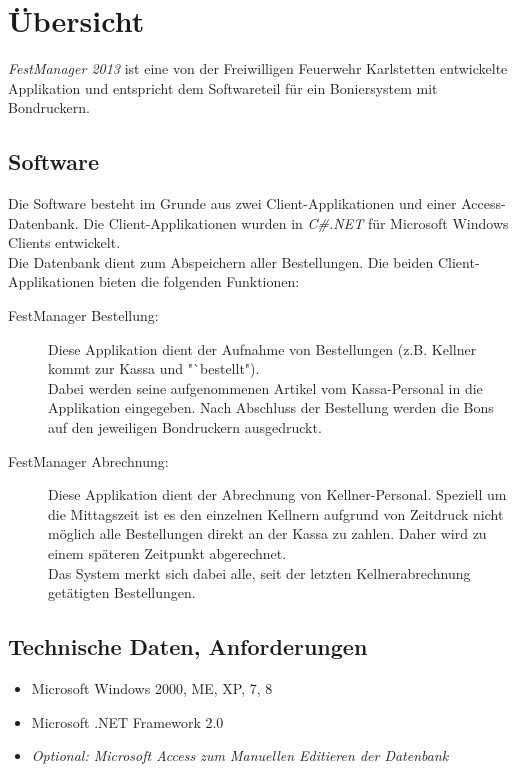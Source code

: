 \documentclass[
10pt, %
a4paper, %
oneside, %
headinclude,footinclude, %
BCOR5mm, %
]{scrartcl}
\theoremstyle{definition} %
\theoremstyle{plain} %
\theoremstyle{remark} %
\begin{document}
{\let\thefootnote\relax{}}




\section{Übersicht}
\textsl{FestManager 2013} ist eine von der Freiwilligen Feuerwehr Karlstetten entwickelte Applikation und entspricht dem Softwareteil für ein Boniersystem mit Bondruckern. 

\subsection{Software}
Die Software besteht im Grunde aus zwei Client-Applikationen und einer Access-Datenbank. Die Client-Applikationen wurden in \textsl{C\#.NET} für Microsoft Windows Clients entwickelt. \\
Die Datenbank dient zum Abspeichern aller Bestellungen. Die beiden Client-Applikationen bieten die folgenden Funktionen:
\begin{description}
	\item[FestManager Bestellung:] Diese Applikation dient der Aufnahme von Bestellungen (z.B. Kellner kommt zur Kassa und "`bestellt"). \\ Dabei werden seine aufgenommenen Artikel vom Kassa-Personal in die Applikation eingegeben. Nach Abschluss der Bestellung werden die Bons auf den jeweiligen Bondruckern ausgedruckt.
	\item[FestManager Abrechnung:] Diese Applikation dient der Abrechnung von Kellner-Personal. Speziell um die Mittagszeit ist es den einzelnen Kellnern aufgrund von Zeitdruck nicht möglich alle Bestellungen direkt an der Kassa zu zahlen. Daher wird zu einem späteren Zeitpunkt abgerechnet. \\ Das System merkt sich dabei alle, seit der letzten Kellnerabrechnung getätigten Bestellungen.
\end{description}

\subsection{Technische Daten, Anforderungen}
\begin{itemize}
	\item Microsoft Windows 2000, ME, XP, 7, 8
	\item Microsoft .NET Framework 2.0
	\item \textit{Optional: Microsoft Access zum Manuellen Editieren der Datenbank}
\end{itemize}
\end{document}
